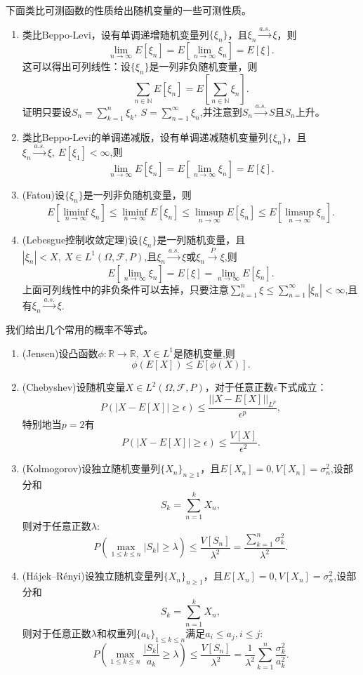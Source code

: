 \documentclass[lang=cn,10pt]{elegantbook}
\begin{document}
	下面类比可测函数的性质给出随机变量的一些可测性质。
	\begin{property}
		\begin{enumerate}
			\item 类比Beppo-Levi，设有单调递增随机变量列\(\{\xi_n\}\)，且\(\xi_n\xrightarrow{a.s.}\xi\)，则
			\[\lim_{n \to \infty}E[\xi_n]=E[\lim_{n \to \infty}\xi_n]=E[\xi].\]这可以得出可列线性：设\(\{\xi_n\}\)是一列非负随机变量，则
			\[\sum_{n\in \mathbb{N}}E[\xi_n]=E[\sum_{n\in \mathbb{N}}\xi_n].\]证明只要设\(S_n=\sum_{k=1}^{n}\xi_k,\ S=\sum_{n=1}^{\infty}\xi_n\),并注意到\(S_n\xrightarrow{a.s.}S\)且\(S_n\)上升。
			\item 类比Beppo-Levi的单调递减版，设有单调递减随机变量列\(\{\xi_n\}\)，且\(\xi_n\xrightarrow{a.s.}\xi,\ E[\xi_1]<\infty\),则
			\[\lim_{n \to \infty}E[\xi_n]=E[\lim_{n \to \infty}\xi_n]=E[\xi].\]
			\item (Fatou)设\(\{\xi_n\}\)是一列非负随机变量，则
			\[E[\liminf_{n \to \infty}\xi_n]\le \liminf_{n \to \infty}E[\xi_n]\le \limsup_{n\to \infty}E[\xi_n]\le E[\limsup_{n\to \infty}\xi_n].\]
			\item (Lebesgue控制收敛定理)设\(\{\xi_n\}\)是一列随机变量，且\(|\xi_n|<X,\ X\in L^1(\Omega,\mathcal{F},P)\),且\(\xi_n\xrightarrow{a.s.}\xi\)或\(\xi_n\xrightarrow{P}\xi\),则
			\[E[\lim_{n \to \infty}\xi_n]=E[\xi]=\lim_{n \to \infty}E[\xi_n].\]
			上面可列线性中的非负条件可以去掉，只要注意\(\sum_{k=1}^{n}\xi\le \sum_{n=1}^{\infty}|\xi_n|<\infty\),且有\(\xi_n\xrightarrow{a.s.}\xi\).
		\end{enumerate}
	\end{property}
	我们给出几个常用的概率不等式。
	\begin{proposition}
		\begin{enumerate}
			\item (Jensen)设凸函数\(\phi:\mathbb{R}\to \mathbb{R},\ X\in L^1\)是随机变量,则\[\phi(E[X])\le E[\phi(X)].\]
			\item (Chebyshev)设随机变量\(X\in L^2(\Omega,\mathcal{F},P)\)，对于任意正数\(\epsilon\)下式成立：\[P(|X-E[X]|\ge \epsilon)\le \frac{||X-E[X]||_{L^p}}{\epsilon^p},\]特别地当\(p=2\)有\[P(|X-E[X]|\ge \epsilon)\le \frac{V[X]}{\epsilon^2}.\]
			\item (Kolmogorov)设独立随机变量列\(\{X_n\}_{n\ge1}\)，且\(E[X_n]=0,V[X_n]=\sigma^2_n\),设部分和\[S_k=\sum_{n=1}^{k}X_n,\]则对于任意正数\(\lambda\):\[P(\max_{1\le k \le n}|S_k|\ge \lambda)\le\frac{V[S_n]}{\lambda^2}=\frac{\sum_{k=1}^{n}\sigma^2_k}{\lambda^2}.\]
			\item (Hájek–Rényi)设独立随机变量列\(\{X_n\}_{n\ge1}\)，且\(E[X_n]=0,V[X_n]=\sigma^2_n\),设部分和\[S_k=\sum_{n=1}^{k}X_n,\]则对于任意正数\(\lambda\)和权重列\(\{a_k\}_{1\le k\le n}\)满足\(a_i\le a_j,i\le j\):\[P(\max_{1\le k \le n}\frac{|S_k|}{a_k}\ge \lambda)\le\frac{V[S_n]}{\lambda^2}=\frac{1}{\lambda^2}\sum_{k=1}^{n}\frac{\sigma^2_k}{a_k^2}.\]
		\end{enumerate}
	\end{proposition}
\end{document}
